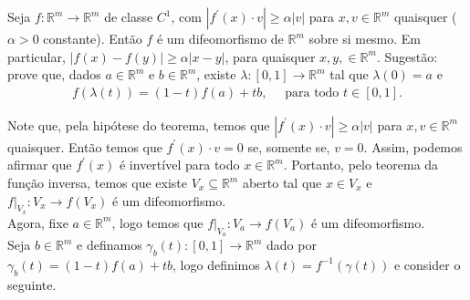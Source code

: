 \begin{homeworkProblem}[Seção 1-9]
  Seja $f:\mathbb{R}^{m}\to\mathbb{R}^{m}$ de classe $C^{1}$, com $|f^{\prime}(x)\cdot v|\geq \alpha |v|$ para $x,v\in\mathbb{R}^{m}$ quaisquer ($\alpha>0$ constante). Então $f$ é um difeomorfismo de $\mathbb{R}^{m}$ sobre si mesmo. Em particular, $|f(x)-f(y)|\geq\alpha|x-y|$, para quaisquer $x,y,\in\mathbb{R}^{m}$. Sugestão: prove que, dados $a\in\mathbb{R}^{m}$ e $b\in\mathbb{R}^{m}$, existe $\lambda:[0,1]\to\mathbb{R}^{m}$ tal que $\lambda(0)=a$ e 
  \begin{align*}
    f(\lambda(t))=(1-t)f(a)+tb,\quad\text{ para todo }t\in[0,1].
  \end{align*}
  \begin{solution}
    Note que, pela hipótese do teorema, temos que $|f^{\prime}(x)\cdot v|\geq \alpha |v|$ para $x,v\in\mathbb{R}^{m}$ quaisquer. Então temos que $f^{\prime}(x)\cdot v=0$ se, somente se, $v=0$. Assim, podemos afirmar que $f^{\prime}(x)$ é invertível para todo $x\in\mathbb{R}^{m}$. Portanto, pelo teorema da função inversa, temos que existe $V_x\subseteq \mathbb{R}^{m}$ aberto tal que $x\in V_x$ e $f|_{V_x}:V_x\to f(V_x)$ é um difeomorfismo.\\

    Agora, fixe $a\in\mathbb{R}^{m}$, logo temos que $f|_{V_a}:V_a\to f(V_a)$ é um difeomorfismo.\\
    Seja $b\in\mathbb{R}^{m}$ e definamos $\gamma_{b}(t):[0,1]\to\mathbb{R}^{m}$ dado por $\gamma_{b}(t)=(1-t)f(a)+tb$, logo definimos $\lambda(t)=f^{-1}(\gamma(t))$ e consider o seguinte.\\


\end{solution}
\end{homeworkProblem}
